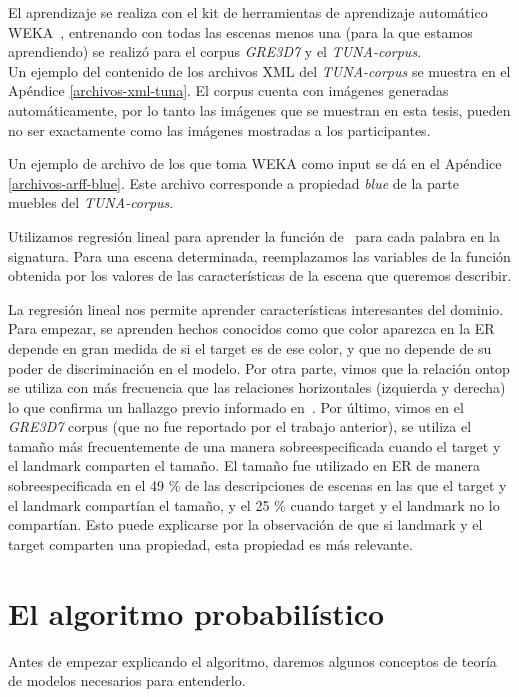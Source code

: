 El aprendizaje se realiza con el kit de herramientas de aprendizaje autom\'atico
WEKA~\cite{Hall:WEK09}, entrenando con todas las escenas menos una (para la que estamos aprendiendo) se realiz\'o para el corpus \textit{GRE3D7} y el \textit{TUNA-corpus}. \\
Un ejemplo del contenido de los archivos XML del \textit{TUNA-corpus} se muestra en el Ap\'endice \ref{archivos-xml-tuna}. El corpus cuenta con im\'agenes generadas autom\'aticamente, por lo tanto las im\'agenes que se muestran en esta tesis, pueden no ser exactamente como las im\'agenes mostradas a los participantes.

Un ejemplo de archivo de los que toma WEKA como input se d\'a en el Ap\'endice \ref{archivos-arff-blue}. Este archivo corresponde a propiedad {\it blue} 
de la parte muebles del \textit{TUNA-corpus}. 

Utilizamos regresi\'on lineal para aprender la funci\'on de
\puse\ para cada palabra en la signatura. Para una escena determinada, reemplazamos
las variables de la funci\'on obtenida por los valores de las caracter\'{i}sticas
de la escena que queremos describir.

La regresi\'on lineal nos permite aprender caracter\'{i}sticas interesantes
 del dominio. Para empezar, se aprenden hechos conocidos
como que color aparezca en la ER depende en gran medida de si el
target es de ese color, y que no depende de su
poder de discriminaci\'on en el modelo. Por otra parte, vimos que la relaci\'on ontop
 se utiliza con m\'as frecuencia que las relaciones horizontales
(izquierda y derecha) lo que confirma un hallazgo previo informado
en~\cite{viet:gene11}. Por \'ultimo, vimos en el
\textit{GRE3D7} corpus (que no fue reportado por el trabajo anterior), se utiliza el tama\~no
m\'as frecuentemente de una manera sobreespecificada cuando el
target y el landmark comparten el tama\~no. El tama\~no fue utilizado en ER de manera sobreespecificada en el 49 \% de
las descripciones de escenas en las que el target y el landmark compart\'ian el tama\~no,
y el 25 \% cuando target y el landmark no lo compart\'ian. Esto puede explicarse por la observaci\'on de que si landmark y el target comparten una propiedad, esta propiedad es m\'as relevante.

\section{El algoritmo probabil\'istico}
\label{sec:algoritmo_probabilistico}
Antes de empezar explicando el algoritmo, daremos algunos conceptos de teor\'ia de modelos necesarios para entenderlo.

